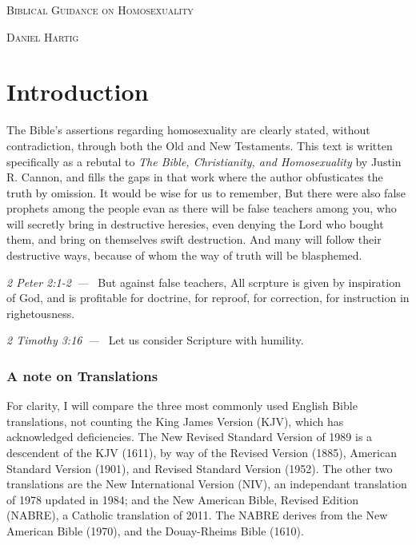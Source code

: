 \documentclass[10pt]{article}
\let\oldquote\quote
\let\endoldquote\endquote
\renewenvironment{quote}[2][]
  {\if\relax\detokenize{#1}\relax
     \def\quoteauthor{#2}%
   \else
     \def\quoteauthor{#2~---~#1}%
   \fi
   \oldquote}
  {\par\nobreak\smallskip\hfill\textit{\quoteauthor}%
   \endoldquote\addvspace{\bigskipamount}}
\begin{document}
\begin{titlepage}\centering
\vfill
{\scshape\huge Biblical Guidance on Homosexuality \par}
\vfill
{\scshape\large Daniel Hartig \par}
\vfill
\end{titlepage}
\singlespace
\section*{Introduction}

The Bible's assertions regarding homosexuality are clearly stated, without contradiction, through both the Old and New Testaments. This text is written specifically as a rebutal to \textit{The Bible, Christianity, and Homosexuality} by Justin R. Cannon, and fills the gaps in that work where the author obfusticates the truth by omission. It would be wise for us to remember,
\begin{quote}{2 Peter 2:1-2}
But there were also false prophets among the people evan as there will be false teachers among you, who will secretly bring in destructive heresies, even denying the Lord who bought them, and bring on themselves swift destruction. And many will follow their destructive ways, because of whom the way of truth will be blasphemed. 
\end{quote} 
But against false teachers, 
\begin{quote}{2 Timothy 3:16}
All scrpture is given by inspiration of God, and is profitable for doctrine, for reproof, for correction, for instruction in righetousness.
\end{quote} 
Let us consider Scripture with humility.

\subsubsection*{A note on Translations}

For clarity, I will compare the three most commonly used English Bible translations, not counting the King James Version (KJV), which has acknowledged deficiencies. The New Revised Standard Version of 1989 is a descendent of the KJV (1611), by way of the Revised Version (1885), American Standard Version (1901), and Revised Standard Version (1952). The other two translations are the New International Version (NIV), an independant translation of 1978 updated in 1984; and the New American Bible, Revised Edition (NABRE), a Catholic translation of 2011. The NABRE derives from the New American Bible (1970), and the Douay-Rheims Bible (1610). 
\end{document}
